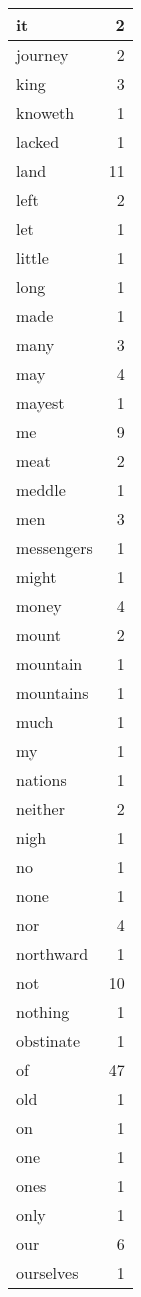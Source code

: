 \begin{center}
\begin{longtable}{l|r}
it & 2 \\ \hline
journey & 2 \\ \hline
king & 3 \\ \hline
knoweth & 1 \\ \hline
lacked & 1 \\ \hline
land & 11 \\ \hline
left & 2 \\ \hline
let & 1 \\ \hline
little & 1 \\ \hline
long & 1 \\ \hline
made & 1 \\ \hline
many & 3 \\ \hline
may & 4 \\ \hline
mayest & 1 \\ \hline
me & 9 \\ \hline
meat & 2 \\ \hline
meddle & 1 \\ \hline
men & 3 \\ \hline
messengers & 1 \\ \hline
might & 1 \\ \hline
money & 4 \\ \hline
mount & 2 \\ \hline
mountain & 1 \\ \hline
mountains & 1 \\ \hline
much & 1 \\ \hline
my & 1 \\ \hline
nations & 1 \\ \hline
neither & 2 \\ \hline
nigh & 1 \\ \hline
no & 1 \\ \hline
none & 1 \\ \hline
nor & 4 \\ \hline
northward & 1 \\ \hline
not & 10 \\ \hline
nothing & 1 \\ \hline
obstinate & 1 \\ \hline
of & 47 \\ \hline
old & 1 \\ \hline
on & 1 \\ \hline
one & 1 \\ \hline
ones & 1 \\ \hline
only & 1 \\ \hline
our & 6 \\ \hline
ourselves & 1 \\ \hline

\end{longtable}
\end{center}

